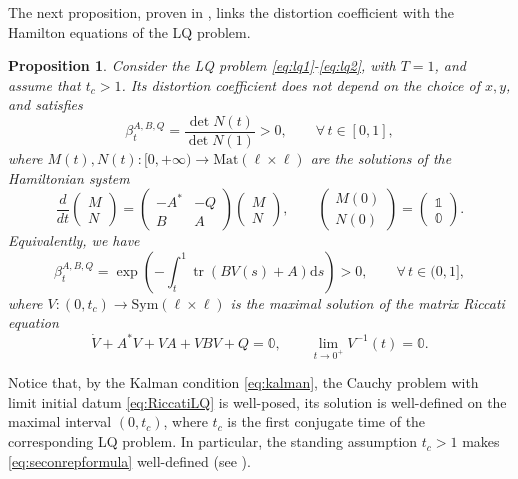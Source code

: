 \documentclass[11pt,a4paper]{article}
\theoremstyle{plain}
\newtheorem{proposition}[theorem]{Proposition}
\theoremstyle{definition}
\theoremstyle{remark}
\numberwithin{equation}{section}
\newcommand{\N}{\mathbb{N}} %
\DeclareMathOperator{\tr}{\mathrm{tr}}
\newcommand{\di}{\mathrm{d}}
\begin{document}
The next proposition, proven in \cite[Prop.\@ 27]{BRMathAnn}, links the distortion coefficient with the Hamilton equations of the LQ problem.
\begin{proposition}\label{p:LQdist}
Consider the LQ problem \eqref{eq:lq1}-\eqref{eq:lq2}, with $T=1$, and assume that $t_c>1$. Its distortion coefficient does not depend on the choice of $x,y$, and satisfies
\begin{equation}\label{eq:firstrepformula}
\beta_{t}^{A,B,Q}=\frac{\det N(t)}{\det N(1)}>0, \qquad \forall\, t \in [0,1],
\end{equation}
where $M(t),N(t) :[0,+\infty) \to \mathrm{Mat}(\ell \times \ell)$ are the solutions of the Hamiltonian system
\begin{equation}\label{eq:hamiltoniansystem}
\frac{d}{dt} \begin{pmatrix}
M \\
N
\end{pmatrix} = \begin{pmatrix}
-A^* & - Q \\
B &  A
\end{pmatrix} \begin{pmatrix}
M \\
N
\end{pmatrix}, \qquad \begin{pmatrix}
M(0) \\N(0) 
\end{pmatrix} = \begin{pmatrix}
\mathbb{1} \\ \mathbb{0}
\end{pmatrix}.
\end{equation}
Equivalently, we have
\begin{equation}\label{eq:seconrepformula}
\beta_{t}^{A,B,Q}=\exp\left( -\int_{t}^{1}\tr(BV(s) +A) \di s\right) >0, \qquad \forall\, t \in (0,1],
\end{equation}
where $V :(0,t_c) \to \mathrm{Sym}(\ell\times \ell)$ is the maximal solution of the matrix Riccati equation
\begin{equation}\label{eq:RiccatiLQ}
\dot{V} + A^*V + VA + VBV + Q = \mathbb{0}, \qquad \lim_{t\to 0^+} V^{-1}(t) = \mathbb{0}.
\end{equation}
\end{proposition}
Notice that, by the Kalman condition \eqref{eq:kalman}, the Cauchy problem with limit initial datum \eqref{eq:RiccatiLQ} is well-posed, its solution is well-defined on the maximal interval $(0,t_c)$, where $t_c$ is the first conjugate time of the corresponding LQ problem. In particular, the standing assumption $t_c>1$ makes \eqref{eq:seconrepformula} well-defined (see \cite[Appendix A]{BR-comparison}).
\end{document}
